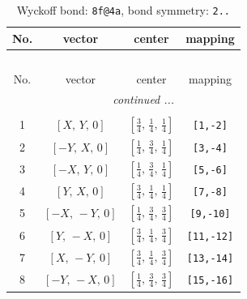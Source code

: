 \documentclass[fleqn,8pt]{jsarticle}
\begin{document}
\begin{longtable}{cccc}
\caption{Wyckoff bond: {\tt 8f@4a}, bond symmetry: {\tt 2..}}
 \\
 \hline \hline
No. & vector & center & mapping \\ \hline \endfirsthead

\multicolumn{3}{l}{\tablename\ \thetable{}} \\
 \hline \hline
No. & vector & center & mapping \\ \hline \endhead

 \hline \hline
\multicolumn{3}{r}{\footnotesize\it continued ...} \\ \endfoot

 \hline \hline
\multicolumn{3}{r}{} \\ \endlastfoot

1 & $\left[ X,\, Y,\, 0 \right]$ & $\left[ \frac{3}{4},\, \frac{1}{4},\, \frac{1}{4} \right]$ & {\tt [1,-2]} \\ \hline
2 & $\left[ - Y,\, X,\, 0 \right]$ & $\left[ \frac{1}{4},\, \frac{3}{4},\, \frac{1}{4} \right]$ & {\tt [3,-4]} \\ \hline
3 & $\left[ - X,\, Y,\, 0 \right]$ & $\left[ \frac{1}{4},\, \frac{3}{4},\, \frac{1}{4} \right]$ & {\tt [5,-6]} \\ \hline
4 & $\left[ Y,\, X,\, 0 \right]$ & $\left[ \frac{3}{4},\, \frac{1}{4},\, \frac{1}{4} \right]$ & {\tt [7,-8]} \\ \hline
5 & $\left[ - X,\, - Y,\, 0 \right]$ & $\left[ \frac{1}{4},\, \frac{3}{4},\, \frac{3}{4} \right]$ & {\tt [9,-10]} \\ \hline
6 & $\left[ Y,\, - X,\, 0 \right]$ & $\left[ \frac{3}{4},\, \frac{1}{4},\, \frac{3}{4} \right]$ & {\tt [11,-12]} \\ \hline
7 & $\left[ X,\, - Y,\, 0 \right]$ & $\left[ \frac{3}{4},\, \frac{1}{4},\, \frac{3}{4} \right]$ & {\tt [13,-14]} \\ \hline
8 & $\left[ - Y,\, - X,\, 0 \right]$ & $\left[ \frac{1}{4},\, \frac{3}{4},\, \frac{3}{4} \right]$ & {\tt [15,-16]} \\
\end{longtable}
\renewcommand{\arraystretch}{1.2}
\end{document}
